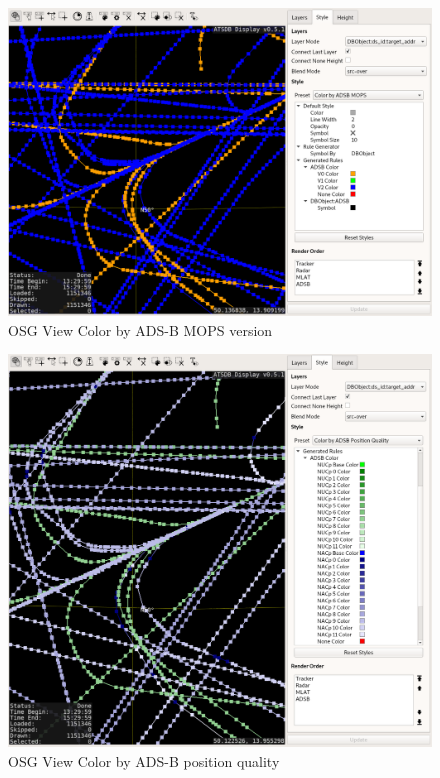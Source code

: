 \begin{figure}[H]
    \hspace*{-2.5cm}
    \includegraphics[width=19cm,frame]{../screenshots/osgview_style_adsb_mops.png}
  \caption{OSG View Color by ADS-B MOPS version}
\end{figure}

\begin{figure}[H]
    \hspace*{-2.5cm}
    \includegraphics[width=19cm,frame]{../screenshots/osgview_style_adsb_position_qual.png}
  \caption{OSG View Color by ADS-B position quality}
\end{figure}

